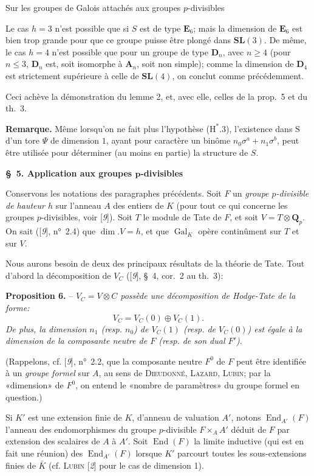 \begin{center}\small Sur les groupes de Galois attachés aux groupes $p$-divisibles\end{center}
Le cas $h=3$ n’est possible que si $S$ est de type $\mathbf{E}_6$; mais la dimension de $\mathbf{E}_6$ est bien trop grande pour que ce groupe puisse être plongé dans $\mathbf{SL}(3)$. De même, le cas $h=4$ n’est possible que pour un groupe de type $\mathbf{D}_n$, avec $n\geqslant 4$ (pour $n\leqslant 3$, $\mathbf{D}_n$ est, soit isomorphe à $\mathbf{A}_n$, soit non simple); comme la dimension de $\mathbf{D}_4$ est strictement supérieure à celle de $\mathbf{SL}(4)$, on conclut comme précédemment.

Ceci achève la démonstration du lemme 2, et, avec elle, celles de la prop.~5 et du th.~3.

\textbf{Remarque.} Même lorsqu’on ne fait plus l’hypothèse ($\mathrm{H}^{*}$.3), l’existence dans $\mathrm{S}$ d’un tore $\varPsi$ de dimension $1$, ayant pour caractère un binôme $n_0\sigma^a+n_1\sigma^b$, peut être utilisée pour déterminer (au moins en partie) la structure de $S$.

\begin{center}\textbf{\S~5. Application aux groupes $\boldsymbol{p}$-divisibles}\end{center}

Conservons les notations des paragraphes précédents. Soit $F$ un \textit{groupe $p$-divisible de hauteur $h$} sur l’anneau $A$ des entiers de $K$ (pour tout ce qui concerne les groupes $p$-divisibles, voir [\textit{9}]). Soit $T$ le module de Tate de $F$, et soit $V=T\otimes\mathbf{Q}_p$. On sait ([\textit{9}], n°~2.4) que $\dim. V=h$, et que $\operatorname{Gal}_K$ opère continûment sur $T$ et sur $V$.

Nous aurons besoin de deux des principaux résultats de la théorie de Tate. Tout d’abord la décomposition de $V_C$ ([\textit{9}], \S~4, cor.~2 au th.~3):

\textbf{Proposition 6.} -- \textit{$V_C=V\otimes C$ possède une décomposition de Hodge-Tate de la forme:}
\[
V_C=V_C(0)\oplus V_C(1).
\]
\textit{De plus, la dimension $n_1$ (resp. $n_0$) de $V_C(1)$ (resp. de $V_C(0)$) est égale à la dimension de la composante neutre de $F$ (resp. de son dual $F'$).}

(Rappelons, cf. [\textit{9}], n°~2.2, que la composante neutre $F^0$ de $F$ peut être identifiée à un \textit{groupe formel} sur $A$, au sens de \textsc{Dieudonné}, \textsc{Lazard}, \textsc{Lubin}; par la «dimension» de $F^0$, on entend le «nombre de paramètres» du groupe formel en question.)

Si $K'$ est une extension finie de $K$, d’anneau de valuation $A'$, notons $\operatorname{End}_{A'}(F)$ l’anneau des endomorphismes du groupe $p$-divisible $F\times_A A'$ déduit de $F$ par extension des scalaires de $A$ à $A'$. Soit $\operatorname{End}(F)$ la limite inductive (qui est en fait une réunion) des $\operatorname{End}_{A'}(F)$ lorsque $K'$ parcourt toutes les sous-extensions finies de $\bar K$ (cf. \textsc{Lubin} [\textit{2}] pour le cas de dimension 1).
